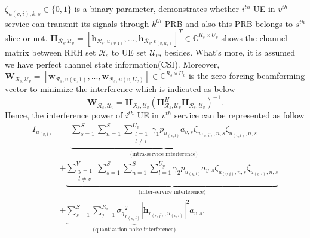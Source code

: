 \documentclass[conference]{IEEEtran}
\begin{document}
$\zeta_{u(v,i),k,s} \in \{0,1\}$ is a binary parameter, demonstrates whether $i^{th}$ UE in $v^{th}$ service can transmit its signals through $k^{th}$ PRB and also this PRB belongs to $s^{th}$ slice or not.
$\boldsymbol{H}_{\mathcal{R}_s,\mathcal{U}_v}=\left[\boldsymbol{h}_{\mathcal{R}_s,u_{(v,1)}},\ldots,\boldsymbol{h}_{\mathcal{R}_s,v_{(v,\mathcal{U}_v)}}\right]^T  \in \mathbb{C}^{{R}_s\times {U}_v }$ 
shows the channel matrix between RRH set $\mathcal{R}_s$ to UE set
$\mathcal{U}_v$, besides. 
What's more, it is assumed we have perfect channel state information(CSI).\newline
Moreover, $\boldsymbol{W}_{\mathcal{R}_s,\mathcal{U}_v} = [\boldsymbol{w}_{\mathcal{R}_s,u(v,1)},...,\boldsymbol{w}_{\mathcal{R}_s,u(v,U_v)}] \in \mathbb{C}^{{R}_s\times U_v} $ is the zero forcing beamforming vector to minimize the interference which is indicated as below
\begin{equation}
\boldsymbol{W}_{\mathcal{R}_s,\mathcal{U}_v} = \boldsymbol{H}_{\mathcal{R}_s,\mathcal{U}_v}(\boldsymbol{H}_{\mathcal{R}_s,\mathcal{U}_v}^H \boldsymbol{H}_{\mathcal{R}_s,\mathcal{U}_v})^{-1}.
\end{equation}
Hence, the interference power of $i^{th}$ UE in $v^{th}$ service can be represented as follow
\begin{equation}
\begin{split}
 I_{u_{(v,i)}} &= 
 \underbrace{\sum_{s=1}^{S}\sum_{n=1}^{S}\sum_{\substack{l=1 \\ l\neq i}}^{{U}_v} \gamma_{1}  p_{u_{(v,l)}}a_{v,s}\zeta_{u_(v,i),n,s}\zeta_{u_(v,l),n,s}}_{\text{(intra-service interference)}}\\
&+ \underbrace{\sum_{\substack{y=1 \\ l\neq v}}^{V}\sum_{s=1}^{S}\sum_{n=1}^{S}\sum_{l=1}^{{U}_y} \gamma_{2}  p_{u_{(y,l)}}a_{y,s} \zeta_{u_(v,i),n,s}\zeta_{u_(y,l),n,s}}_{\text{(inter-service interference)}}\\
&+\underbrace{ \sum_{s=1}^{S} \sum_{j=1}^{{R}_s} {\sigma_q}_{r_{(s,j)}}^2 |\boldsymbol{h}_{r_{(s,j)}, u_{(v,i)}}|^2 a_{v,s}}_{\text{(quantization noise interference)}}.
\end{split}
\end{equation}
\end{document}
